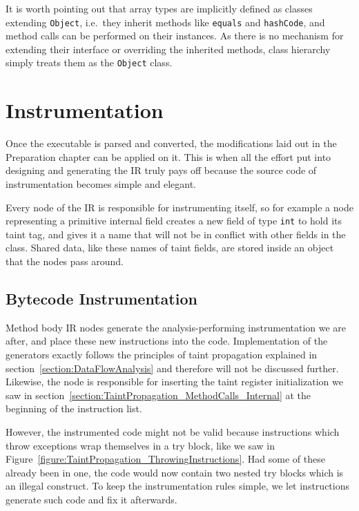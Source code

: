 \documentclass[12pt,twoside,notitlepage]{report}
\begin{document}
It is worth pointing out that array types are implicitly defined as classes extending \verb$Object$, i.e.\ they inherit methods like \verb$equals$ and \verb$hashCode$, and method calls can be performed on their instances. As there is no mechanism for extending their interface or overriding the inherited methods, class hierarchy simply treats them as the \verb$Object$ class.

\section{Instrumentation}

Once the executable is parsed and converted, the modifications laid out in the Preparation chapter can be applied on it. This is when all the effort put into designing and generating the IR truly pays off because the source code of instrumentation becomes simple and elegant. 

Every node of the IR is responsible for instrumenting itself, so for example a node representing a primitive internal field creates a new field of type \verb$int$ to hold its taint tag, and gives it a name that will not be in conflict with other fields in the class. Shared data, like these names of taint fields, are stored inside an object that the nodes pass around.

\subsection{Bytecode Instrumentation}

Method body IR nodes generate the analysis-performing instrumentation we are after, and place these new instructions into the code. Implementation of the generators exactly follows the principles of taint propagation explained in section~\ref{section:DataFlowAnalysis} and therefore will not be discussed further. Likewise, the node is responsible for inserting the taint register initialization we saw in section~\ref{section:TaintPropagation_MethodCalls_Internal} at the beginning of the instruction list.

However, the instrumented code might not be valid because instructions which throw exceptions wrap themselves in a try block, like we saw in Figure~\ref{figure:TaintPropagation_ThrowingInstructions}. Had some of these already been in one, the code would now contain two nested try blocks which is an illegal construct. To keep the instrumentation rules simple, we let instructions generate such code and fix it afterwards.
\end{document}

